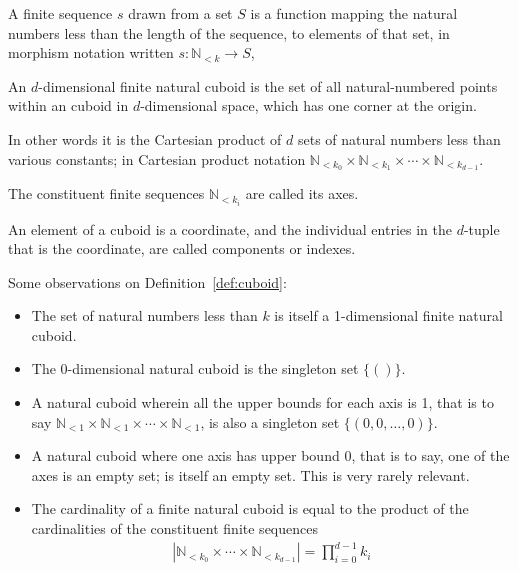 \documentclass{DIKU-report-variant}
\newcommand\Nat{\mathbb{N}}
\begin{document}
\begin{definition}
  \label{def:finseq}
  A finite sequence \(s\) drawn from a set \(S\) is a function mapping the natural
  numbers less than the length of the sequence, to elements of that set,
  in morphism notation written \(s : \Nat_{<k} \to S\),
\end{definition}

\begin{definition}
  \label{def:cuboid}
  An \(d\)-dimensional finite natural cuboid is the set of all natural-numbered points
  within an cuboid in \(d\)-dimensional space, which has one corner at the origin.

  In other words it is the Cartesian product of \(d\) sets of natural numbers
  less than various constants; in Cartesian product notation
  \(\Nat_{<k_0} \times \Nat_{<k_1} \times \cdots \times \Nat_{<k_{d-1}}\).

  The constituent finite sequences \(\Nat_{<k_i}\) are called its axes.

  An element of a cuboid is a coordinate, and the individual entries in
  the \(d\)-tuple that is the coordinate, are called components or indexes.
\end{definition}
\begin{observation}
  \label{ob:cuboid}
  Some observations on Definition~\ref{def:cuboid}:
  \begin{itemize}
    \item The set of natural numbers less than \(k\) is itself a 1-dimensional finite natural cuboid.
    \item The 0-dimensional natural cuboid is the singleton set \(\{()\}\).
    \item A natural cuboid wherein all the upper bounds for each axis is 1, that
      is to say \(\Nat_{<1} \times \Nat_{<1} \times \cdots \times \Nat_{<1}\), is
      also a singleton set \(\{(0, 0, \dots, 0)\}\).
    \item A natural cuboid where one axis has upper bound 0, that is to
      say, one of the axes is an empty set; is itself an empty set. This is very rarely relevant.
    \item The cardinality of a finite natural cuboid is equal to the product of
      the cardinalities of the constituent finite sequences
      \begin{align*}
      |\Nat_{<k_0} \times \cdots \times \Nat_{<k_{d-1}}| = \prod_{i=0}^{d-1} k_i
      \end{align*}
  \end{itemize}
\end{observation}
\end{document}
